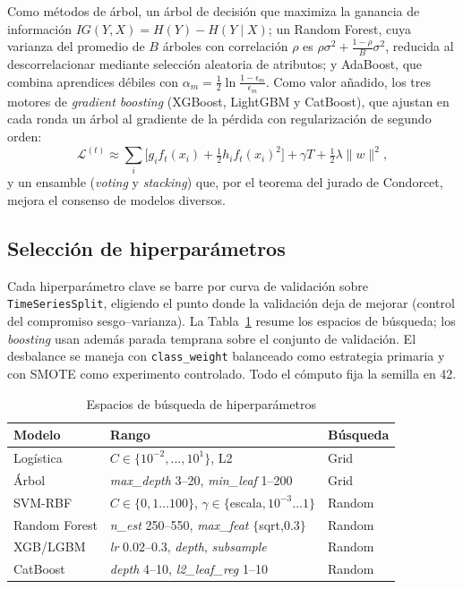 \documentclass[conference]{IEEEtran}
\begin{document}
Como m\'etodos de \'arbol, un \'arbol de decisi\'on que maximiza la
ganancia de informaci\'on $IG(Y,X)=H(Y)-H(Y\mid X)$; un Random Forest, cuya
varianza del promedio de $B$ \'arboles con correlaci\'on $\rho$ es
$\rho\sigma^2+\frac{1-\rho}{B}\sigma^2$, reducida al descorrelacionar mediante selecci\'on
aleatoria de atributos; y AdaBoost, que combina aprendices d\'ebiles con
$\alpha_m=\tfrac12\ln\frac{1-\epsilon_m}{\epsilon_m}$. Como valor a\~nadido, los
tres motores de \emph{gradient boosting} (XGBoost, LightGBM y CatBoost), que ajustan en
cada ronda un \'arbol al gradiente de la p\'erdida con regularizaci\'on de segundo orden:
\begin{equation}
\mathcal{L}^{(t)}\!\approx\!\sum_i\!\Big[g_i f_t(x_i)+\tfrac12 h_i f_t(x_i)^2\Big]+\gamma T+\tfrac12\lambda\lVert w\rVert^2,
\end{equation}
y un ensamble (\emph{voting} y \emph{stacking}) que, por el teorema del jurado de
Condorcet, mejora el consenso de modelos diversos.

\subsection{Selecci\'on de hiperpar\'ametros}
Cada hiperpar\'ametro clave se barre por curva de validaci\'on sobre
\texttt{TimeSeriesSplit}, eligiendo el punto donde la validaci\'on deja de mejorar (control
del compromiso sesgo--varianza). La Tabla~\ref{tab:hyper} resume los espacios de b\'usqueda;
los \emph{boosting} usan adem\'as parada temprana sobre el conjunto de validaci\'on. El
desbalance se maneja con \texttt{class\_weight} balanceado como estrategia primaria y con
SMOTE como experimento controlado. Todo el c\'omputo fija la semilla en 42.

\begin{table}[t]
\caption{Espacios de b\'usqueda de hiperpar\'ametros}
\label{tab:hyper}
\centering
\footnotesize
\begin{tabular}{@{}p{1.6cm}p{4.2cm}p{1.1cm}@{}}
\toprule
\textbf{Modelo} & \textbf{Rango} & \textbf{B\'usqueda} \\
\midrule
Log\'istica & $C\in\{10^{-2},\dots,10^{1}\}$, L2 & Grid \\
\'Arbol & \emph{max\_depth} 3--20, \emph{min\_leaf} 1--200 & Grid \\
SVM-RBF & $C\in\{0{,}1\dots100\}$, $\gamma\in\{$escala$,10^{-3}\dots1\}$ & Random \\
Random Forest & \emph{n\_est} 250--550, \emph{max\_feat} $\{$sqrt,0.3$\}$ & Random \\
XGB/LGBM & \emph{lr} 0.02--0.3, \emph{depth}, \emph{subsample} & Random \\
CatBoost & \emph{depth} 4--10, \emph{l2\_leaf\_reg} 1--10 & Random \\
\bottomrule
\end{tabular}
\end{table}
\end{document}
